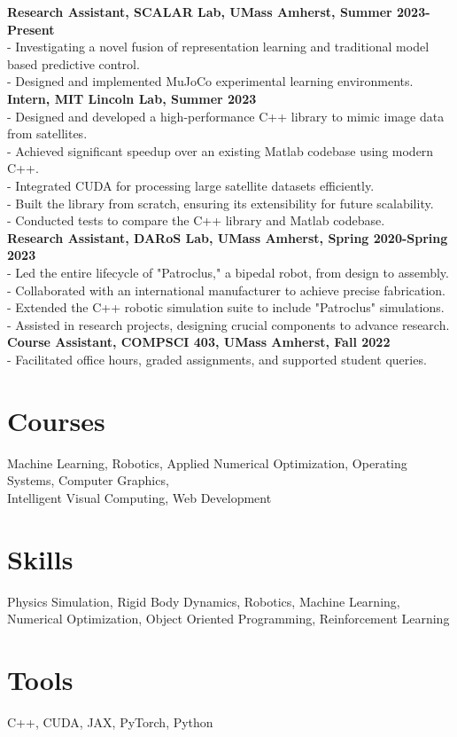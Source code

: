 \documentclass[letterpaper, 10pt]{article}
\begin{document}
\noindent
\textbf{Research Assistant, SCALAR Lab, UMass Amherst, Summer 2023-Present} \\
- Investigating a novel fusion of representation learning and traditional model based predictive control. \\
- Designed and implemented MuJoCo experimental learning environments. \\

\noindent
\textbf{Intern, MIT Lincoln Lab, Summer 2023} \\
- Designed and developed a high-performance C++ library to mimic image data from satellites. \\
- Achieved significant speedup over an existing Matlab codebase using modern C++. \\
- Integrated CUDA for processing large satellite datasets efficiently. \\
- Built the library from scratch, ensuring its extensibility for future scalability. \\
- Conducted tests to compare the C++ library and Matlab codebase.\\

\noindent
\textbf{Research Assistant, DARoS Lab, UMass Amherst, Spring 2020-Spring 2023} \\
- Led the entire lifecycle of "Patroclus," a bipedal robot, from design to assembly. \\
- Collaborated with an international manufacturer to achieve precise fabrication. \\
- Extended the C++ robotic simulation suite to include "Patroclus" simulations. \\
- Assisted in research projects, designing crucial components to advance research.\\

\noindent
\textbf{Course Assistant, COMPSCI 403, UMass Amherst, Fall 2022} \\
- Facilitated office hours, graded assignments, and supported student queries.\\

\section*{Courses}
Machine Learning, Robotics, Applied Numerical Optimization, Operating Systems, Computer Graphics,\\ Intelligent Visual Computing, Web Development

\section*{Skills}
Physics Simulation, Rigid Body Dynamics, Robotics, Machine Learning, Numerical Optimization, Object Oriented Programming, Reinforcement Learning

\section*{Tools}
C++, CUDA, JAX, PyTorch, Python
\end{document}
